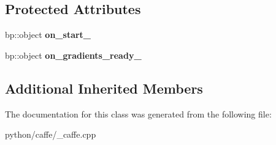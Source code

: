 \subsection*{Protected Attributes}
\begin{DoxyCompactItemize}
\item 
\mbox{\label{classcaffe_1_1_solver_callback_a568a772903169c021fd375ebf4c08445}} 
bp\+::object {\bfseries on\+\_\+start\+\_\+}
\item 
\mbox{\label{classcaffe_1_1_solver_callback_a88587b0db42ca6748bca77a823b0aa96}} 
bp\+::object {\bfseries on\+\_\+gradients\+\_\+ready\+\_\+}
\end{DoxyCompactItemize}
\subsection*{Additional Inherited Members}


The documentation for this class was generated from the following file\+:\begin{DoxyCompactItemize}
\item 
python/caffe/\+\_\+caffe.\+cpp\end{DoxyCompactItemize}
